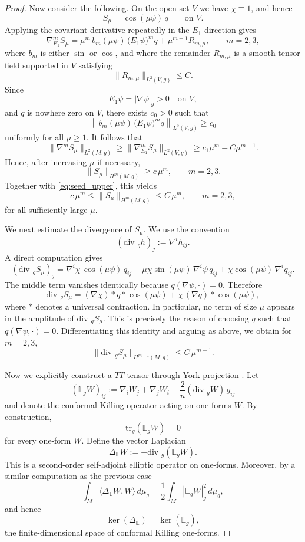 \documentclass{amsart}
\renewcommand{\div}{\mbox{div }}
\newcommand{\tr}{\mbox{tr}}
\begin{document}
\begin{proof}
\smallskip
\noindent Now consider the following. On the open set $V$ we have $\chi\equiv 1$, and hence
\[
S_{\mu}=\cos(\mu\psi)\,q
\qquad\text{on }V.
\]
Applying the covariant derivative repeatedly in the $E_{1}$-direction gives
\[
\nabla_{E_{1}}^{m} S_{\mu}
=
\mu^{m}\,b_{m}(\mu\psi)\,\big(E_{1}\psi\big)^{m}q
+
\mu^{m-1}R_{m,\mu},
\qquad m=2,3,
\]
where $b_{m}$ is either $\sin$ or $\cos$, and where the remainder $R_{m,\mu}$ is a smooth tensor field supported in $V$ satisfying
\[
\|R_{m,\mu}\|_{L^{2}(V,g)}\leq C.
\]
Since
\[
E_{1}\psi = |\nabla \psi|_{g}>0
\quad\text{on }V,
\]
and $q$ is nowhere zero on $V$, there exists $c_{0}>0$ such that
\[
\left\| b_{m}(\mu\psi)\,\big(E_{1}\psi\big)^{m}q\right\|_{L^{2}(V,g)}\geq c_{0}
\]
uniformly for all $\mu\geq 1$. It follows that
\[
\|\nabla^{m}S_{\mu}\|_{L^{2}(M,g)}
\geq
\|\nabla_{E_{1}}^{m}S_{\mu}\|_{L^{2}(V,g)}
\geq c_{1}\mu^{m}-C\mu^{m-1}.
\]
Hence, after increasing $\mu$ if necessary,
\[
\|S_{\mu}\|_{H^{m}(M,g)}\geq c\,\mu^{m},
\qquad m=2,3.
\]
Together with \eqref{eq:seed_upper}, this yields
\begin{equation}
\label{eq:seed_two_sided}
c\,\mu^{m}\leq \|S_{\mu}\|_{H^{m}(M,g)}\leq C\,\mu^{m},
\qquad m=2,3,
\end{equation}
for all sufficiently large $\mu$.


\noindent We next estimate the divergence of $S_{\mu}$. We use the convention
\[
(\div_{g} h)_{j}:=\nabla^{i}h_{ij}.
\]
A direct computation gives
\[
(\div_{g}S_{\mu})_{j}
=
\nabla^{i}\chi \,\cos(\mu\psi)\, q_{ij}
-\mu \chi \sin(\mu\psi)\,\nabla^{i}\psi\, q_{ij}
+\chi \cos(\mu\psi)\,\nabla^{i}q_{ij}.
\]
The middle term vanishes identically because $q(\nabla \psi,\cdot)=0$. Therefore
\[
\div_{g}S_{\mu}
=
(\nabla \chi)*q*\cos(\mu\psi)
+
\chi\,(\nabla q)*\cos(\mu\psi),
\]
where $*$ denotes a universal contraction. In particular, no term of size $\mu$ appears in the amplitude of $\div_{g}S_{\mu}$. This is precisely the reason of choosing $q$ such that $q(\nabla\psi,\cdot)=0$. Differentiating this identity and arguing as above, we obtain for $m=2,3$,
\begin{equation}
\label{eq:div_seed}
\|\div_{g}S_{\mu}\|_{H^{m-1}(M,g)}\leq C\,\mu^{m-1}.
\end{equation}

\noindent Now we explicitly construct a $TT$ tensor through York-projection \cite{york}.
Let
\[
(\mathbb L_{g}W)_{ij}
:=
\nabla_{i}W_{j}
+
\nabla_{j}W_{i}
-
\frac{2}{n}(\div_{g}W)\,g_{ij}
\]
and denote the conformal Killing operator acting on one-forms $W$. By construction,
\[
\tr_{g}(\mathbb L_{g}W)=0
\]
for every one-form $W$. Define the vector Laplacian
\[
\Delta_{\mathbb L}W:=-\div_{g}(\mathbb L_{g}W).
\]
This is a second-order self-adjoint elliptic operator on one-forms. Moreover, by a similar computation as the previous case
\[
\int_{M}\langle \Delta_{\mathbb L}W,W\rangle\,d\mu_{g}
=
\frac12\int_{M} |\mathbb L_{g}W|_{g}^{2}\,d\mu_{g},
\]
and hence
\[
\ker(\Delta_{\mathbb L})=\ker(\mathbb L_{g}),
\]
the finite-dimensional space of conformal Killing one-forms.




\end{proof}
\end{document}
